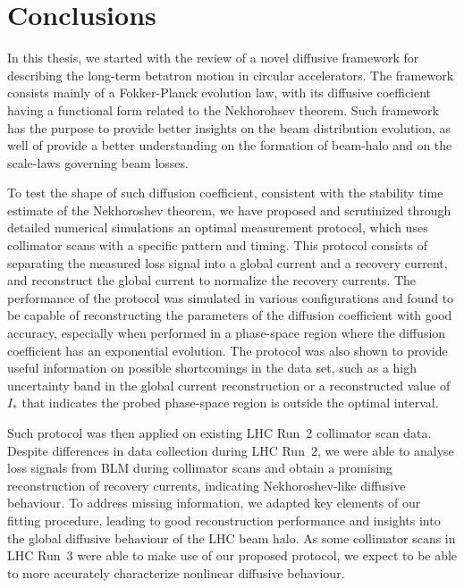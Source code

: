 \chapter*{Conclusions}

In this thesis, we started with the review of a novel diffusive framework for describing the long-term betatron motion in circular accelerators. The framework consists mainly of a Fokker-Planck evolution law, with its diffusive coefficient having a functional form related to the Nekhorohsev theorem. Such framework has the purpose to provide better insights on the beam distribution evolution, as well of provide a better understanding on the formation of beam-halo and on the scale-laws governing beam losses.

To test the shape of such diffusion coefficient, consistent with the stability time estimate of the Nekhoroshev theorem, we have proposed and scrutinized through detailed numerical simulations an optimal measurement protocol, which uses collimator scans with a specific pattern and timing. This protocol consists of separating the measured loss signal into a global current and a recovery current, and reconstruct the global current to normalize the recovery currents. The performance of the protocol was simulated in various configurations and found to be capable of reconstructing the parameters of the diffusion coefficient with good accuracy, especially when performed in a phase-space region where the diffusion coefficient has an exponential evolution. The protocol was also shown to provide useful information on possible shortcomings in the data set, such as a high uncertainty band in the global current reconstruction or a reconstructed value of $I_\ast$ that indicates the probed phase-space region is outside the optimal interval.

Such protocol was then applied on existing LHC Run~2 collimator scan data. Despite differences in data collection during LHC Run~2, we were able to analyse loss signals from BLM during collimator scans and obtain a promising reconstruction of recovery currents, indicating Nekhoroshev-like diffusive behaviour. To address missing information, we adapted key elements of our fitting procedure, leading to good reconstruction performance and insights into the global diffusive behaviour of the LHC beam halo. As some collimator scans in LHC Run~3 were able to make use of our proposed protocol, we expect to be able to more accurately characterize nonlinear diffusive behaviour.

